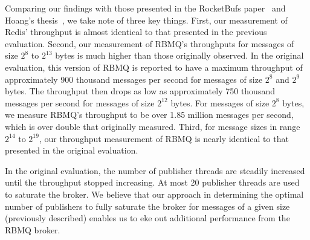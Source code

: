 \documentclass[letterpaper,twocolumn,10pt]{article}
\begin{document}
Comparing our findings with those presented in the RocketBufs paper~\cite{Rocketbufs} and Hoang's thesis~\cite{hoang2019building}, we take note of three key things.
First, our measurement of Redis' throughput is almost identical to that presented in the previous evaluation.
Second, our measurement of RBMQ's throughputs for messages of size $2^8$ to $2^{13}$ bytes is much higher than those originally observed.
In the original evaluation, this version of RBMQ is reported to have a maximum throughput of approximately 900 thousand messages per second for messages of size $2^8$ and $2^9$ bytes.
The throughput then drops as low as approximately 750 thousand messages per second for messages of size $2^{12}$ bytes.
For messages of size $2^8$ bytes, we measure RBMQ's throughput to be over 1.85 million messages per second, which is over double that originally measured.
Third, for message sizes in range $2^{14}$ to $2^{19}$, our throughput measurement of RBMQ is nearly identical to that presented in the original evaluation.

In the original evaluation, the number of publisher threads are steadily increased until the throughput stopped increasing.
At most 20 publisher threads are used to saturate the broker.
We believe that our approach in determining the optimal number of publishers to fully saturate the broker for messages of a given size (previously described) enables us to eke out additional performance from the RBMQ broker.


\end{document}
